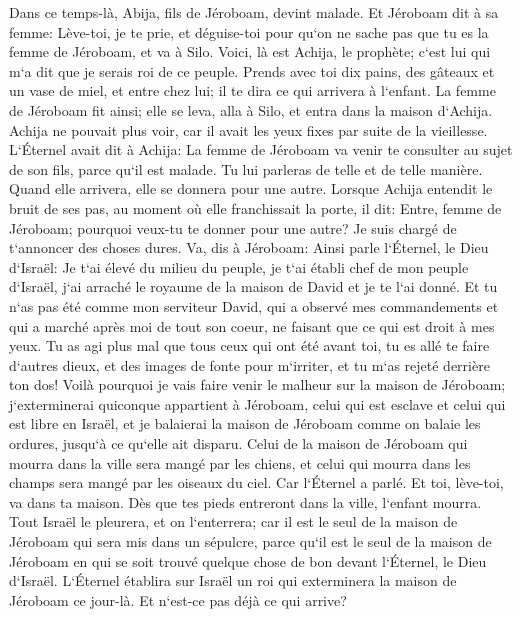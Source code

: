 \verse Dans ce temps-là, Abija, fils de Jéroboam, devint malade. 
\verse Et Jéroboam dit à sa femme: Lève-toi, je te prie, et déguise-toi pour qu`on ne sache pas que tu es la femme de Jéroboam, et va à Silo. Voici, là est Achija, le prophète; c`est lui qui m`a dit que je serais roi de ce peuple. 
\verse Prends avec toi dix pains, des gâteaux et un vase de miel, et entre chez lui; il te dira ce qui arrivera à l`enfant. 
\verse La femme de Jéroboam fit ainsi; elle se leva, alla à Silo, et entra dans la maison d`Achija. Achija ne pouvait plus voir, car il avait les yeux fixes par suite de la vieillesse. 
\verse L`Éternel avait dit à Achija: La femme de Jéroboam va venir te consulter au sujet de son fils, parce qu`il est malade. Tu lui parleras de telle et de telle manière. Quand elle arrivera, elle se donnera pour une autre. 
\verse Lorsque Achija entendit le bruit de ses pas, au moment où elle franchissait la porte, il dit: Entre, femme de Jéroboam; pourquoi veux-tu te donner pour une autre? Je suis chargé de t`annoncer des choses dures. 
\verse Va, dis à Jéroboam: Ainsi parle l`Éternel, le Dieu d`Israël: Je t`ai élevé du milieu du peuple, je t`ai établi chef de mon peuple d`Israël, 
\verse j`ai arraché le royaume de la maison de David et je te l`ai donné. Et tu n`as pas été comme mon serviteur David, qui a observé mes commandements et qui a marché après moi de tout son coeur, ne faisant que ce qui est droit à mes yeux. 
\verse Tu as agi plus mal que tous ceux qui ont été avant toi, tu es allé te faire d`autres dieux, et des images de fonte pour m`irriter, et tu m`as rejeté derrière ton dos! 
\verse Voilà pourquoi je vais faire venir le malheur sur la maison de Jéroboam; j`exterminerai quiconque appartient à Jéroboam, celui qui est esclave et celui qui est libre en Israël, et je balaierai la maison de Jéroboam comme on balaie les ordures, jusqu`à ce qu`elle ait disparu. 
\verse Celui de la maison de Jéroboam qui mourra dans la ville sera mangé par les chiens, et celui qui mourra dans les champs sera mangé par les oiseaux du ciel. Car l`Éternel a parlé. 
\verse Et toi, lève-toi, va dans ta maison. Dès que tes pieds entreront dans la ville, l`enfant mourra. 
\verse Tout Israël le pleurera, et on l`enterrera; car il est le seul de la maison de Jéroboam qui sera mis dans un sépulcre, parce qu`il est le seul de la maison de Jéroboam en qui se soit trouvé quelque chose de bon devant l`Éternel, le Dieu d`Israël. 
\verse L`Éternel établira sur Israël un roi qui exterminera la maison de Jéroboam ce jour-là. Et n`est-ce pas déjà ce qui arrive? 
